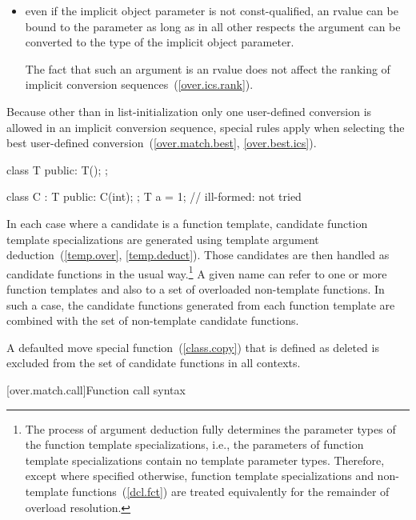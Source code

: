 \begin{itemize}
\item
even if the implicit object parameter is not
const-qualified,
an rvalue can be bound to the parameter
as long as in all other respects the argument can be
converted to the type of the implicit object parameter.
\begin{note} The fact that such an argument is an rvalue does not
affect the ranking of implicit conversion sequences~(\ref{over.ics.rank}).
\end{note}
\end{itemize}

\pnum
Because other than in list-initialization only one user-defined conversion
is allowed
in an
implicit conversion sequence, special rules apply when selecting
the best user-defined conversion~(\ref{over.match.best},
\ref{over.best.ics}).
\begin{example}

\begin{codeblock}
class T {
public:
  T();
};

class C : T {
public:
  C(int);
};
T a = 1;            // ill-formed:  not tried
\end{codeblock}
\end{example}

\pnum
In each case where a candidate is a function template, candidate
function template specializations
are generated using template argument deduction~(\ref{temp.over},
\ref{temp.deduct}).
Those candidates are then handled as candidate
functions in the usual way.\footnote{The process of argument deduction fully
determines the parameter types of
the
function template specializations,
i.e., the parameters of
function template specializations
contain
no template parameter types.
Therefore, except where specified otherwise,
function template specializations
and non-template functions~(\ref{dcl.fct}) are treated equivalently
for the remainder of overload resolution.}
A given name can refer to one or more function templates and also
to a set of overloaded non-template functions.
In such a case, the
candidate functions generated from each function template are combined
with the set of non-template candidate functions.

\pnum
A defaulted move special function~(\ref{class.copy}) that is
defined as deleted is excluded from the set of candidate functions in all
contexts.

[over.match.call]{Function call syntax}%

